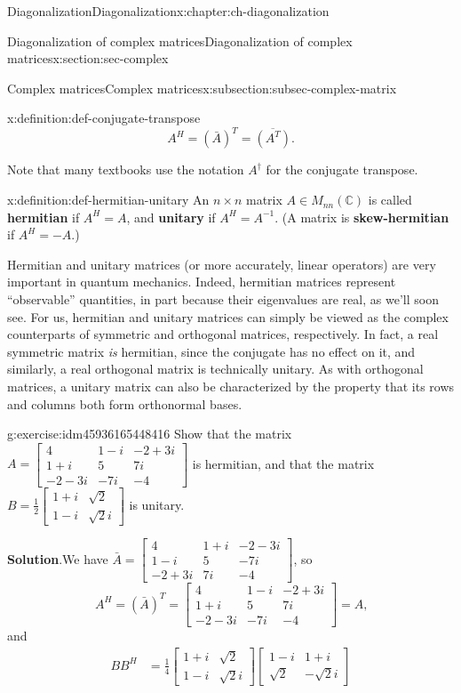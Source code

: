 \documentclass[oneside,10pt,]{book}
\newcommand{\blocktitlefont}{\relax}
\newcommand{\terminology}[1]{\textbf{#1}}
\numberwithin{equation}{section}
\newcommand{\bbm}{\begin{bmatrix}}
\newcommand{\ebm}{\end{bmatrix}}
\renewcommand{\C}{\mathbb{C}}
\newcommand{\amp}{&}
\begin{document}
\begin{chapterptx}{Diagonalization}{}{Diagonalization}{}{}{x:chapter:ch-diagonalization}
\begin{sectionptx}{Diagonalization of complex matrices}{}{Diagonalization of complex matrices}{}{}{x:section:sec-complex}
\begin{subsectionptx}{Complex matrices}{}{Complex matrices}{}{}{x:subsection:subsec-complex-matrix}
\begin{definition}{}{x:definition:def-conjugate-transpose}
\begin{equation*}
A^H = (\bar{A})^T=\overline{(A^T)}\text{.}
\end{equation*}
%
\end{definition}
Note that many textbooks use the notation \(A^\dagger\) for the conjugate transpose.%
\begin{definition}{}{x:definition:def-hermitian-unitary}%
An \(n\times n\) matrix \(A\in M_{nn}(\C)\) is called \terminology{hermitian} if \(A^H = A\), and \terminology{unitary} if \(A^H = A^{-1}\). (A matrix is \terminology{skew-hermitian} if \(A^H=-A\).)%
\end{definition}
Hermitian and unitary matrices (or more accurately, linear operators) are very important in quantum mechanics. Indeed, hermitian matrices represent ``observable'' quantities, in part because their eigenvalues are real, as we'll soon see. For us, hermitian and unitary matrices can simply be viewed as the complex counterparts of symmetric and orthogonal matrices, respectively. In fact, a real symmetric matrix \emph{is} hermitian, since the conjugate has no effect on it, and similarly, a real orthogonal matrix is technically unitary. As with orthogonal matrices, a unitary matrix can also be characterized by the property that its rows and columns both form orthonormal bases.%
\begin{inlineexercise}{}{g:exercise:idm45936165448416}%
Show that the matrix \(A = \bbm 4\amp 1-i\amp -2+3i\\1+i\amp 5 \amp 7i\\-2-3i\amp -7i\amp -4\ebm\) is hermitian, and that the matrix \(B = \frac12\bbm 1+i\amp \sqrt{2}\\1-i\amp\sqrt{2}i\ebm\) is unitary.%
\par\smallskip%
\noindent\textbf{\blocktitlefont Solution}.\label{g:solution:idm45936165446912}{}\hypertarget{g:solution:idm45936165446912}{}\quad{}We have \(\bar{A}=\bbm 4\amp 1+i\amp -2-3i\\1-i\amp 5 \amp -7i\\-2+3i\amp 7i\amp -4\ebm\), so%
\begin{equation*}
A^H = (\bar{A})^T = \bbm 4\amp 1-i\amp -2+3i\\1+i\amp 5\amp 7i\\-2-3i\amp -7i\amp -4\ebm = A\text{,}
\end{equation*}
and%
\begin{align*}
BB^H \amp =\frac14\bbm 1+i\amp \sqrt{2}\\1-i\amp\sqrt{2}i\ebm\bbm 1-i\amp 1+i\\\sqrt{2}\amp-\sqrt{2}i\ebm \\

\end{align*}
\end{inlineexercise}
\end{subsectionptx}
\end{sectionptx}
\end{chapterptx}
\end{document}
